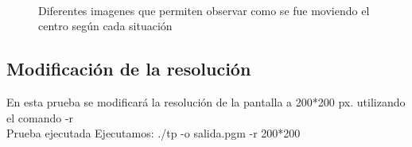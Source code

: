\documentclass [12pt, a4paper]{article}
\begin{document}
			\begin{figure}[h]
		\centering
		\\ 
		\caption{Diferentes imagenes que permiten observar como se fue moviendo el centro según cada situación}
		\label{f:comparacion3}
	\end{figure} 
\subsection{Modificación de la resolución}
En esta prueba se modificará la resolución de la pantalla a 200*200 px. utilizando el comando -r
\\
Prueba ejecutada
Ejecutamos: ./tp -o salida.pgm -r 200*200\\
\end{document}
